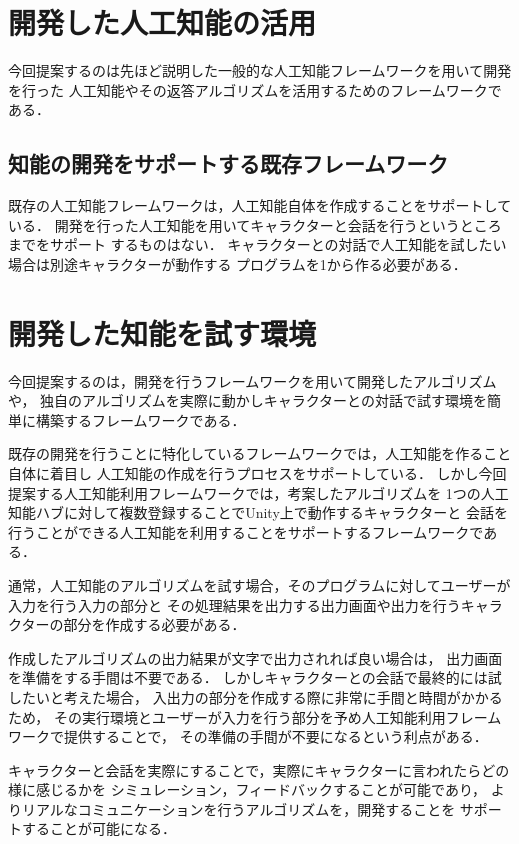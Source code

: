 \section{開発した人工知能の活用}
今回提案するのは先ほど説明した一般的な人工知能フレームワークを用いて開発を行った
人工知能やその返答アルゴリズムを活用するためのフレームワークである．
\subsection{知能の開発をサポートする既存フレームワーク}
既存の人工知能フレームワークは，人工知能自体を作成することをサポートしている．
開発を行った人工知能を用いてキャラクターと会話を行うというところまでをサポート
するものはない．
キャラクターとの対話で人工知能を試したい場合は別途キャラクターが動作する
プログラムを1から作る必要がある．

\section{開発した知能を試す環境}
今回提案するのは，開発を行うフレームワークを用いて開発したアルゴリズムや，
独自のアルゴリズムを実際に動かしキャラクターとの対話で試す環境を簡単に構築するフレームワークである．

既存の開発を行うことに特化しているフレームワークでは，人工知能を作ること自体に着目し
人工知能の作成を行うプロセスをサポートしている．
しかし今回提案する人工知能利用フレームワークでは，考案したアルゴリズムを
1つの人工知能ハブに対して複数登録することでUnity上で動作するキャラクターと
会話を行うことができる人工知能を利用することをサポートするフレームワークである．

通常，人工知能のアルゴリズムを試す場合，そのプログラムに対してユーザーが入力を行う入力の部分と
その処理結果を出力する出力画面や出力を行うキャラクターの部分を作成する必要がある．

作成したアルゴリズムの出力結果が文字で出力されれば良い場合は，
出力画面を準備をする手間は不要である．
しかしキャラクターとの会話で最終的には試したいと考えた場合，
入出力の部分を作成する際に非常に手間と時間がかかるため，
その実行環境とユーザーが入力を行う部分を予め人工知能利用フレームワークで提供することで，
その準備の手間が不要になるという利点がある．

キャラクターと会話を実際にすることで，実際にキャラクターに言われたらどの様に感じるかを
シミュレーション，フィードバックすることが可能であり，
よりリアルなコミュニケーションを行うアルゴリズムを，開発することを
サポートすることが可能になる．

